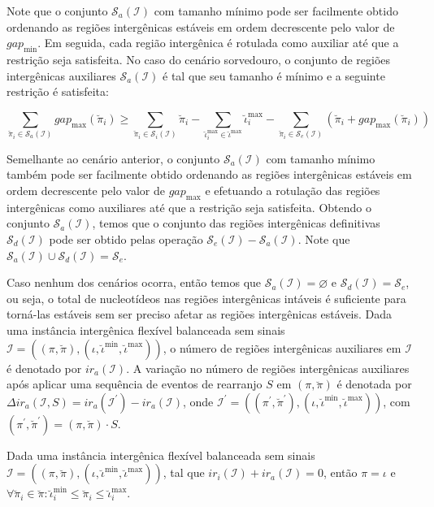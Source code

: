 Note que o conjunto $\mathcal{S}_{a}(\mathcal{I})$ com tamanho mínimo pode ser facilmente obtido ordenando as regiões intergênicas estáveis em ordem decrescente pelo valor de $gap_{\min}$. Em seguida, cada região intergênica é rotulada como auxiliar até que a restrição seja satisfeita. No caso do cenário sorvedouro, o conjunto de regiões intergênicas auxiliares $\mathcal{S}_{a}(\mathcal{I})$ é tal que seu tamanho é mínimo e a seguinte restrição é satisfeita:

$$\sum_{\breve\pi_i \in \mathcal{S}_{a}(\mathcal{I})} gap_{\max}(\breve\pi_i) \ge \sum_{\breve\pi_i \in \mathcal{S}_{i}(\mathcal{I})} \breve\pi_i - \sum_{\breve\iota_{i}^{\max}  \in \breve\iota^{\max}} \breve\iota_{i}^{\max} - \sum_{\breve\pi_i \in \mathcal{S}_{e}(\mathcal{I})} (\breve\pi_i + gap_{\max}(\breve\pi_i))$$

Semelhante ao cenário anterior, o conjunto $\mathcal{S}_{a}(\mathcal{I})$ com tamanho mínimo também pode ser facilmente obtido ordenando as regiões intergênicas estáveis em ordem decrescente pelo valor de $gap_{\max}$ e efetuando a rotulação das regiões intergênicas como auxiliares até que a restrição seja satisfeita. Obtendo o conjunto $\mathcal{S}_{a}(\mathcal{I})$, temos que o conjunto das regiões intergênicas definitivas $\mathcal{S}_{d}(\mathcal{I})$ pode ser obtido pelas operação $\mathcal{S}_{e}(\mathcal{I}) - \mathcal{S}_{a}(\mathcal{I})$. Note que $\mathcal{S}_{a}(\mathcal{I}) \cup \mathcal{S}_{d}(\mathcal{I}) = \mathcal{S}_{e}$.

Caso nenhum dos cenários ocorra, então temos que $\mathcal{S}_{a}(\mathcal{I})=\varnothing$ e $ \mathcal{S}_{d}(\mathcal{I}) = \mathcal{S}_{e}$, ou seja, o total de nucleotídeos nas regiões intergênicas intáveis é suficiente para torná-las estáveis sem ser preciso afetar as regiões intergênicas estáveis. Dada uma instância intergênica flexível balanceada sem sinais $\mathcal{I} = ((\pi,\breve\pi),(\iota,\breve\iota^{\min},\breve\iota^{\max}))$, o número de regiões intergênicas auxiliares em $\mathcal{I}$ é denotado por $ir_a(\mathcal{I})$. A variação no número de regiões intergênicas auxiliares após aplicar uma sequência de eventos de rearranjo $S$ em $(\pi,\breve\pi)$ é denotada por $\Delta ir_a(\mathcal{I},S) = ir_a(\mathcal{I}^{\prime}) - ir_a(\mathcal{I})$, onde $\mathcal{I}^{\prime} = ((\pi^{\prime}, \breve\pi^{\prime}),(\iota,\breve\iota^{\min},\breve\iota^{\max}))$, com $(\pi^{\prime}, \breve\pi^{\prime}) = (\pi, \breve\pi) \cdot S$.

\begin{remark}\label{remark:PGEYZJME}
Dada uma instância intergênica flexível balanceada sem sinais $\mathcal{I} = ((\pi,\breve\pi),(\iota,\breve\iota^{\min},\breve\iota^{\max}))$, tal que $ir_i(\mathcal{I}) + ir_a(\mathcal{I}) = 0$, então $\pi = \iota$ e $\forall \breve\pi_i \in \breve\pi: \breve\iota^{\min}_i \le \breve\pi_i \le \breve\iota^{\max}_i$.
\end{remark}

